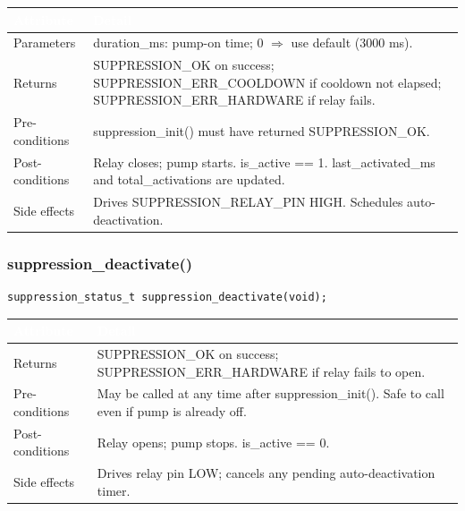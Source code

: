 \documentclass[12pt,a4paper]{article}
\newcommand{\theadtext}[1]{\textcolor{white}{\textbf{#1}}}
\newcommand{\fn}[1]{{\footnotesize\ttfamily #1}}
\begin{document}
\begin{table}[H]\centering\small
\begin{tabularx}{\textwidth}{L{3.5cm} X}
\toprule
{}\theadtext{Attribute} & \theadtext{Detail} \\
\midrule
{}   Parameters     & \fn{duration\_ms}: pump-on time; 0 $\Rightarrow$ use default (3000 ms). \\
 Returns        & \fn{SUPPRESSION\_OK} on success; \fn{SUPPRESSION\_ERR\_COOLDOWN} if cooldown not elapsed; \fn{SUPPRESSION\_ERR\_HARDWARE} if relay fails. \\
   Pre-conditions & \fn{suppression\_init()} must have returned \fn{SUPPRESSION\_OK}. \\
 Post-conditions & Relay closes; pump starts. \fn{is\_active == 1}. \fn{last\_activated\_ms} and \fn{total\_activations} are updated. \\
   Side effects   & Drives \fn{SUPPRESSION\_RELAY\_PIN} HIGH. Schedules auto-deactivation. \\
\bottomrule
\end{tabularx}
\end{table}

\subsubsection{\fn{suppression\_deactivate()}}

\begin{lstlisting}[caption={Signature}]
suppression_status_t suppression_deactivate(void);
\end{lstlisting}

\begin{table}[H]\centering\small
\begin{tabularx}{\textwidth}{L{3.5cm} X}
\toprule
{}\theadtext{Attribute} & \theadtext{Detail} \\
\midrule
{}   Returns        & \fn{SUPPRESSION\_OK} on success; \fn{SUPPRESSION\_ERR\_HARDWARE} if relay fails to open. \\
 Pre-conditions & May be called at any time after \fn{suppression\_init()}. Safe to call even if pump is already off. \\
   Post-conditions & Relay opens; pump stops. \fn{is\_active == 0}. \\
 Side effects   & Drives relay pin LOW; cancels any pending auto-deactivation timer. \\
\bottomrule
\end{tabularx}
\end{table}
\end{document}
